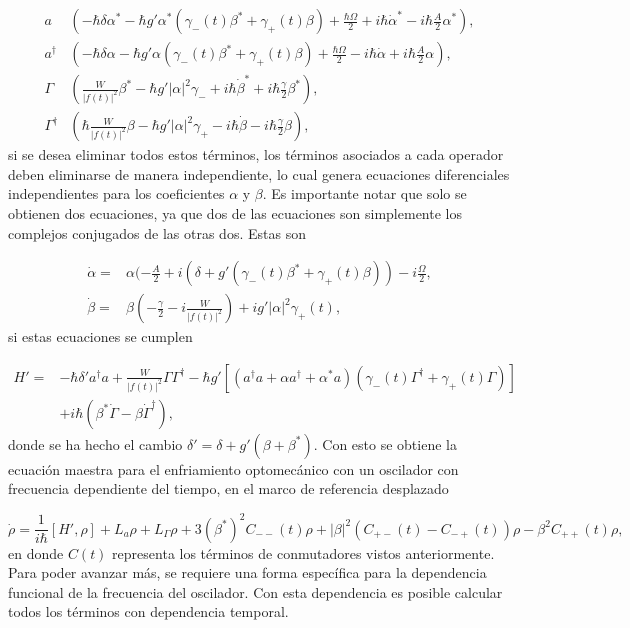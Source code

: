 \documentclass[a4paper,10pt]{report}
\begin{document}
\begin{align}
a&(-\hbar\delta\alpha^* -\hbar g' \alpha^*(\gamma_-(t) \beta^* + \gamma_+(t) \beta)+ \frac{\hbar\Omega}{2} + i\hbar\dot{\alpha}^* -i\hbar\frac{A}{2}\alpha^*),\\
a^\dagger&(-\hbar\delta\alpha -\hbar g' \alpha(\gamma_-(t) \beta^* + \gamma_+(t) \beta)+ \frac{\hbar\Omega}{2} - i\hbar\dot{\alpha} +i\hbar\frac{A}{2}\alpha),\\
\Gamma&(\frac{W}{|f(t)|^2}\beta^*-\hbar g'|\alpha|^2\gamma_- +  i\hbar\dot{\beta}^*+i\hbar\frac{\gamma}{2}\beta^*),\\
\Gamma^\dagger&(\hbar\frac{W}{|f(t)|^2}\beta-\hbar g'|\alpha|^2\gamma_+ -  i\hbar\dot{\beta}-i\hbar\frac{\gamma}{2}\beta),
\end{align} si se desea eliminar todos estos términos, los términos asociados a cada operador deben eliminarse de manera independiente, lo cual genera ecuaciones diferenciales independientes para los coeficientes $\alpha$ y $\beta$. Es importante notar que solo se obtienen dos ecuaciones, ya que dos de las ecuaciones son simplemente los complejos conjugados de las otras dos. Estas son

\begin{align}
\dot{\alpha} =& \alpha(-\frac{A}{2}+i(\delta+g'(\gamma_-(t) \beta^* + \gamma_+(t) \beta))-i\frac{\Omega}{2},\\
\dot{\beta} =& \beta(-\frac{\gamma}{2}-i\frac{W}{|f(t)|^2})+ig'|\alpha|^2\gamma_+(t),
\end{align} si estas ecuaciones se cumplen


\begin{align*}
H'=& -\hbar \delta' a^\dagger a + \frac{W}{|f(t)|^2}\Gamma \Gamma^\dagger -\hbar g'[(a^{\dagger}a +\alpha a^{\dagger}+\alpha^* a)(\gamma_-(t)\Gamma^{\dagger}+\gamma_+(t)\Gamma)]\\
&+ i\hbar(\beta^*\dot{\Gamma} - \beta \dot{\Gamma}^\dagger),
\end{align*}  donde se ha hecho el cambio $\delta' = \delta + g'(\beta + \beta^*)$. Con esto se obtiene la ecuación maestra para el enfriamiento optomecánico con un oscilador con frecuencia dependiente del tiempo, en el marco de referencia desplazado

\begin{equation}\label{DLCMasterEquation}
\dot{\rho} = \frac{1}{i\hbar}[H',\rho] + L_a\rho + L_\Gamma\rho + 3(\beta^*)^2C_{--}(t)\rho + |\beta|^2(C_{+-}(t) - C_{-+}(t))\rho -  \beta^2 C_{++}(t)\rho,
\end{equation} en donde $C(t)$ representa los términos de conmutadores vistos anteriormente. Para poder avanzar más, se requiere una forma específica para la dependencia funcional de la frecuencia del oscilador. Con esta dependencia es posible calcular todos los términos con dependencia temporal.
\end{document}

